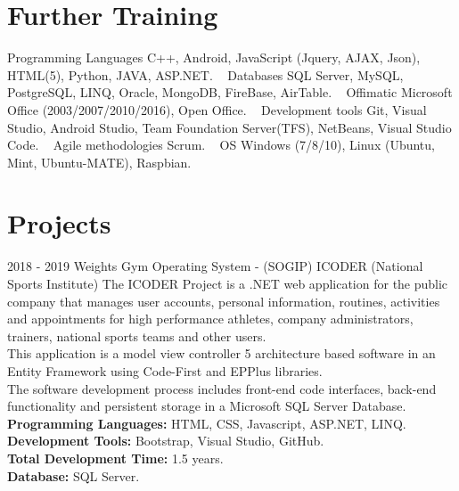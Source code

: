 \documentclass[]{friggeri-cv}
\begin{document}
\section{Further Training}
\begin{entrylist}
    \entry
    {}
    {Programming Languages}
    {}
    {C++, Android, JavaScript (Jquery, AJAX, Json), HTML(5), Python, JAVA, ASP.NET.}
    ~
    \entry
    {}
    {Databases}
    {}
    {SQL Server, MySQL, PostgreSQL, LINQ, Oracle, MongoDB, FireBase, AirTable.}
    ~
    \entry
    {}
    {Offimatic}
    {}
    {Microsoft Office (2003/2007/2010/2016), Open Office.}
    ~
    \entry
    {}
    {Development tools}
    {}
    {Git, Visual Studio, Android Studio, Team Foundation Server(TFS), NetBeans, Visual Studio Code.}
    ~
    \entry
    {}
    {Agile methodologies}
    {}
    {Scrum.}
    ~
    \entry
    {}
    {OS}
    {}
    {Windows (7/8/10), Linux (Ubuntu, Mint, Ubuntu-MATE), Raspbian.}
    
\end{entrylist}

\section{Projects}
\begin{entrylist}
    \entry
    {2018 - 2019}
    {Weights Gym Operating System - (SOGIP)}
    {ICODER (National Sports Institute)}
    {The ICODER Project is a .NET web application for the public company that manages user accounts, personal information, routines, activities and appointments for high performance athletes, company administrators, trainers, national sports teams and other users. \\
    This application is a model view controller 5 architecture based software in an Entity Framework using Code-First and EPPlus libraries. \\
    The software development process includes front-end code interfaces, back-end functionality and persistent storage in a Microsoft SQL Server Database. \\
    \textbf{Programming Languages:} HTML, CSS, Javascript, ASP.NET, LINQ. \\
    \textbf{Development Tools:} Bootstrap, Visual Studio, GitHub. \\
    \textbf{Total Development Time:} 1.5 years. \\
    \textbf{Database:} SQL Server. }
    
    
\end{entrylist}
\end{document}
